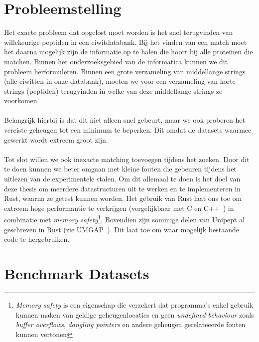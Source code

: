 \documentclass[11pt,dutch,faculty=we,layout=titlefont,underline=false,titleUppercase=true,titleUnderline=true]{ugent2016-report}
\begin{document}
    \section{Probleemstelling}\label{sec:probleemstelling}
    Het exacte probleem dat opgelost moet worden is het snel terugvinden van willekeurige peptiden in een eiwitdatabank.
    Bij het vinden van een match moet het daarna mogelijk zijn de informatie op te halen die hoort bij alle proteïnen die matchen.
    Binnen het onderzoeksgebied van de informatica kunnen we dit probleem herformuleren.
    Binnen een grote verzameling van middellange strings (alle eiwitten in onze databank), moeten we voor een verzameling van korte strings (peptiden) terugvinden in welke van deze middellange strings ze voorkomen.
    \\ \\
    Belangrijk hierbij is dat dit niet alleen snel gebeurt, maar we ook proberen het vereiste geheugen tot een minimum te beperken.
    Dit omdat de datasets waarmee gewerkt wordt extreem groot zijn.
    \\ \\
    Tot slot willen we ook inexacte matching toevoegen tijdens het zoeken.
    Door dit te doen kunnen we beter omgaan met kleine fouten die gebeuren tijdens het uitlezen van de experimentele stalen.
    Om dit allemaal te doen is het doel van deze thesis om meerdere datastructuren uit te werken en te implementeren in Rust, waarna ze getest kunnen worden.
    Het gebruik van Rust laat ons toe om extreem hoge performantie te verkrijgen (vergelijkbaar met C en C++~\cite{rustPerformantie}) in combinatie met \textit{memory safety}\footnote{\textit{Memory safety} is een eigenschap die verzekert dat programma's enkel gebruik kunnen maken van geldige geheugenlocaties en geen \textit{undefined behaviour} zoals \textit{buffer overflows}, \textit{dangling pointers} en andere geheugen gerelateeerde fouten kunnen vertonen}.
    Bovendien zijn sommige delen van Unipept al geschreven in Rust (zie UMGAP~\cite{UMGAP_paper, UMGAP_source}).
    Dit laat toe om waar mogelijk bestaande code te hergebruiken.


    \section{Benchmark Datasets}\label{sec:datasets}
\end{document}
